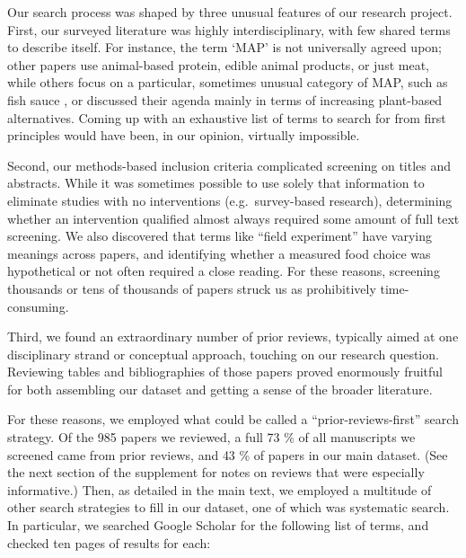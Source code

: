 \documentclass[sn-nature,referee,pdflatex]{sn-jnl}
\begin{document}
Our search process was shaped by three unusual features of our research
project. First, our surveyed literature was highly interdisciplinary,
with few shared terms to describe itself. For instance, the term `MAP'
is not universally agreed upon; other papers use animal-based protein,
edible animal products, or just meat, while others focus on a
particular, sometimes unusual category of MAP, such as fish sauce
\citep{kanchanachitra2020}, or discussed their agenda mainly in terms of
increasing plant-based alternatives. Coming up with an exhaustive list
of terms to search for from first principles would have been, in our
opinion, virtually impossible.

Second, our methods-based inclusion criteria complicated screening on
titles and abstracts. While it was sometimes possible to use solely that
information to eliminate studies with no interventions
(e.g.~survey-based research), determining whether an intervention
qualified almost always required some amount of full text screening. We
also discovered that terms like ``field experiment'' have varying
meanings across papers, and identifying whether a measured food choice
was hypothetical or not often required a close reading. For these
reasons, screening thousands or tens of thousands of papers struck us as
prohibitively time-consuming.

Third, we found an extraordinary number of prior reviews, typically
aimed at one disciplinary strand or conceptual approach, touching on our
research question. Reviewing tables and bibliographies of those papers
proved enormously fruitful for both assembling our dataset and getting a
sense of the broader literature.

For these reasons, we employed what could be called a
``prior-reviews-first'' search strategy. Of the 985 papers we reviewed,
a full 73 \% of all manuscripts we screened came from prior reviews, and
43 \% of papers in our main dataset. (See the next section of the
supplement for notes on reviews that were especially informative.) Then,
as detailed in the main text, we employed a multitude of other search
strategies to fill in our dataset, one of which was systematic search.
In particular, we searched Google Scholar for the following list of
terms, and checked ten pages of results for each:
\end{document}
